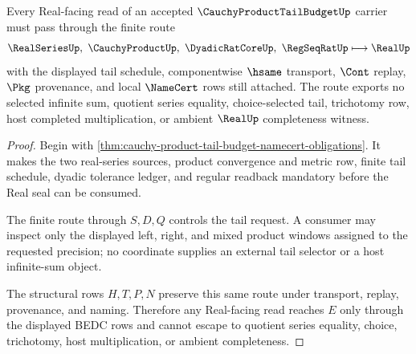 \begin{theorem}
\label{thm:cauchy-product-tail-budget-real-seal-nonescape}
Every Real-facing read of an accepted $\CauchyProductTailBudgetUp$ carrier must pass through the finite route
$$
\RealSeriesUp,\ \CauchyProductUp,\ \DyadicRatCoreUp,\ \RegSeqRatUp \longmapsto \RealUp
$$
with the displayed tail schedule, componentwise $\hsame$ transport, $\Cont$ replay, $\Pkg$ provenance, and local $\NameCert$ rows still attached. The route exports no selected infinite sum, quotient series equality, choice-selected tail, trichotomy row, host completed multiplication, or ambient $\RealUp$ completeness witness.
\end{theorem}
\begin{proof}
Begin with \autoref{thm:cauchy-product-tail-budget-namecert-obligations}. It makes the two real-series sources, product convergence and metric row, finite tail schedule, dyadic tolerance ledger, and regular readback mandatory before the Real seal can be consumed.

The finite route through $S,D,Q$ controls the tail request. A consumer may inspect only the displayed left, right, and mixed product windows assigned to the requested precision; no coordinate supplies an external tail selector or a host infinite-sum object.

The structural rows $H,T,P,N$ preserve this same route under transport, replay, provenance, and naming. Therefore any Real-facing read reaches $E$ only through the displayed BEDC rows and cannot escape to quotient series equality, choice, trichotomy, host multiplication, or ambient completeness.
\end{proof}



